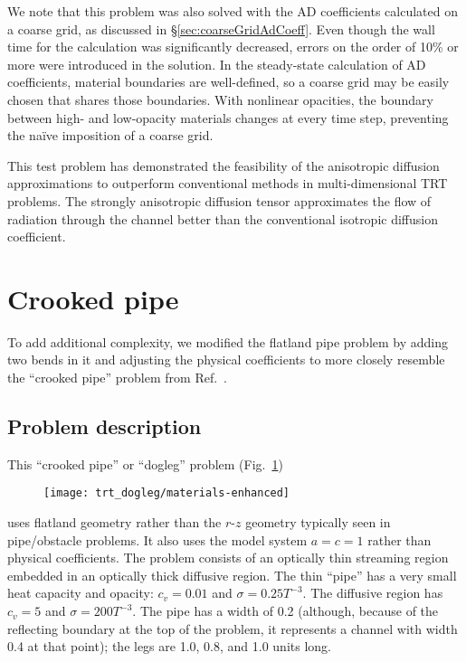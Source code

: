 We note that this problem was also solved with the AD coefficients calculated on
a coarse grid, as discussed in \S\ref{sec:coarseGridAdCoeff}. Even though the
wall time for the calculation was significantly decreased, errors on the order
of 10\% or more were introduced in the solution. In the steady-state calculation
of AD coefficients, material boundaries are well-defined, so a coarse grid may
be easily chosen that shares those boundaries. With nonlinear opacities, the
boundary between high- and low-opacity materials changes at every time step,
preventing the na\"ive imposition of a coarse grid.

This test problem has demonstrated the feasibility of the anisotropic diffusion
approximations to outperform conventional methods in multi-dimensional
TRT problems. The strongly anisotropic diffusion tensor approximates the flow of
radiation through the channel better than the conventional isotropic diffusion
coefficient.

\section{Crooked pipe}

To add additional complexity, we modified the flatland pipe problem by adding
two bends in it and adjusting the physical coefficients to more closely resemble
the ``crooked pipe'' problem from Ref.~\cite{Gen2001}.

\subsection{Problem description}

This ``crooked pipe'' or ``dogleg'' problem (Fig.~\ref{fig:doglegMaterials})
%
\begin{figure}[htb]
  \centering
  \texttt{[image: trt\_dogleg/materials-enhanced]}
  \label{fig:doglegMaterials}
\end{figure}
%
uses flatland geometry rather than the $r$-$z$ geometry typically seen in
pipe/obstacle problems. It also uses the model system $a=c=1$ rather than
physical coefficients. The problem consists of an optically thin
streaming region embedded in an optically thick diffusive region. The thin
``pipe'' has a very small heat capacity and opacity: $c_v=0.01$ and
$\sigma=0.25T^{-3}$. The diffusive region has $c_v=5$ and $\sigma=200 T^{-3}$.
The pipe has a width of 0.2 (although, because of the reflecting boundary at
the top of the problem, it represents a channel with width 0.4 at that point);
the legs are 1.0, 0.8, and 1.0 units long.

